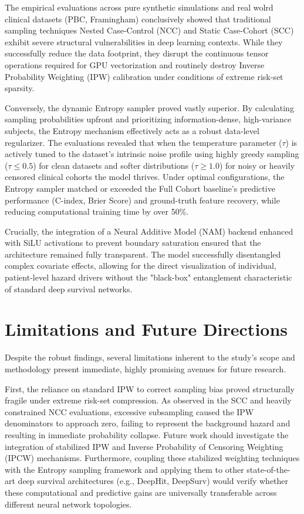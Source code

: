 \documentclass[a4paper,twoside,12pt]{report}
\begin{document}
The empirical evaluations across pure synthetic simulations and real wolrd clinical datasets (PBC, Framingham) conclusively showed that traditional sampling techniques Nested Case-Control (NCC) and Static Case-Cohort (SCC) exhibit severe structural vulnerabilities in deep learning contexts. While they successfully reduce the data footprint, they disrupt the continuous tensor operations required for GPU vectorization and routinely destroy Inverse Probability Weighting (IPW) calibration under conditions of extreme risk-set sparsity. 

Conversely, the dynamic Entropy sampler proved vastly superior. By calculating sampling probabilities upfront and prioritizing information-dense, high-variance subjects, the Entropy mechanism effectively acts as a robust data-level regularizer. The evaluations revealed that when the temperature parameter ($\tau$) is actively tuned to the dataset's intrinsic noise profile using highly greedy sampling ($\tau \le 0.5$) for clean datasets and softer distributions ($\tau \ge 1.0$) for noisy or heavily censored clinical cohorts the model thrives. Under optimal configurations, the Entropy sampler matched or exceeded the Full Cohort baseline's predictive performance (C-index, Brier Score) and ground-truth feature recovery, while reducing computational training time by over 50\%. 

Crucially, the integration of a Neural Additive Model (NAM) backend enhanced with SiLU activations to prevent boundary saturation ensured that the architecture remained fully transparent. The model successfully disentangled complex covariate effects, allowing for the direct visualization of individual, patient-level hazard drivers without the "black-box" entanglement characteristic of standard deep survival networks.

\section{Limitations and Future Directions}

Despite the robust findings, several limitations inherent to the study's scope and methodology present immediate, highly promising avenues for future research.

First, the reliance on standard IPW to correct sampling bias proved structurally fragile under extreme risk-set compression. As observed in the SCC and heavily constrained NCC evaluations, excessive subsampling caused the IPW denominators to approach zero, failing to represent the background hazard and resulting in immediate probability collapse. Future work should investigate the integration of stabilized IPW and Inverse Probability of Censoring Weighting (IPCW) mechanisms. Furthermore, coupling these stabilized weighting techniques with the Entropy sampling framework and applying them to other state-of-the-art deep survival architectures (e.g., DeepHit, DeepSurv) would verify whether these computational and predictive gains are universally transferable across different neural network topologies.
\end{document}
